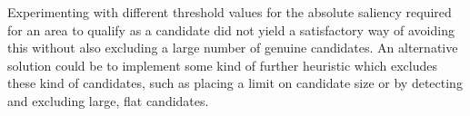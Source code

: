 Experimenting with different threshold values for the absolute saliency required for an area to qualify as a candidate did not yield a satisfactory way of avoiding this without also excluding a large number of genuine candidates.
An alternative solution could be to implement some kind of further heuristic which excludes these kind of candidates, such as placing a limit on candidate size or by detecting and excluding large, flat candidates.

